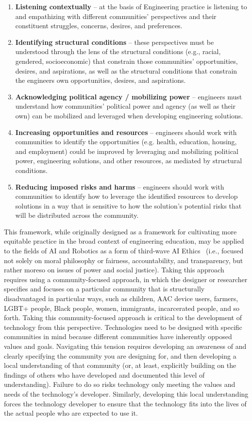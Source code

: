 \documentclass[letterpaper]{article} %
\begin{document}
\begin{enumerate}
    \item \textbf{Listening contextually} -- at the basis of Engineering practice is listening to and empathizing with different communities' perspectives and their constituent struggles, concerns, desires, and preferences.
    \item \textbf{Identifying structural conditions} -- these perspectives must be understood through the lens of the structural conditions (e.g., racial, gendered, socioeconomic) that constrain those communities' opportunities, desires, and aspirations, as well as the structural conditions that constrain the engineers own opportunities, desires, and aspirations.
    \item \textbf{Acknowledging political agency / mobilizing power} -- engineers must understand how communities' political power and agency (as well as their own) can be mobilized and leveraged when developing engineering solutions.
    \item \textbf{Increasing opportunities and resources} -- engineers should work with communities to identify the opportunities (e.g. health, education, housing, and employment) could be improved by leveraging and mobilizing political power, engineering solutions, and other resources, as mediated by structural conditions.
    \item \textbf{Reducing imposed risks and harms} -- engineers should work with communities to identify how to leverage the identified resources to develop solutions in a way that is sensitive to how the solution's potential risks that will be distributed across the community.
\end{enumerate}

This framework, while originally designed as a framework for cultivating more equitable practice in the broad context of engineering education, may be applied to the fields of AI and Robotics as a form of third-wave AI Ethics~\cite{bennett2020point,le2020we} (i.e., focused not solely on moral philosophy or fairness, accountability, and transparency, but rather moreso on issues of power and social justice). Taking this approach requires using a community-focused approach, in which the designer or researcher specifies and focuses on a particular community that is structurally disadvantaged in particular ways, such as children, AAC device users, farmers, LGBT+ people, Black people, women, immigrants, incarcerated people, and so forth. Taking this community-focused approach is critical to the development of technology from this perspective. Technologies need to be designed with specific communities in mind because different communities have inherently opposed values and goals. Navigating this tension requires developing an awareness of and clearly specifying the community you are designing for, and then developing a local understanding of that community (or, at least, explicitly building on the findings of others who have developed and documented this level of understanding). Failure to do so risks technology only meeting the values and needs of the technology's developer. Similarly, developing this local understanding forces the technology developer to ensure that the technology fits into the lives of the actual people who are expected to use it.
\end{document}
